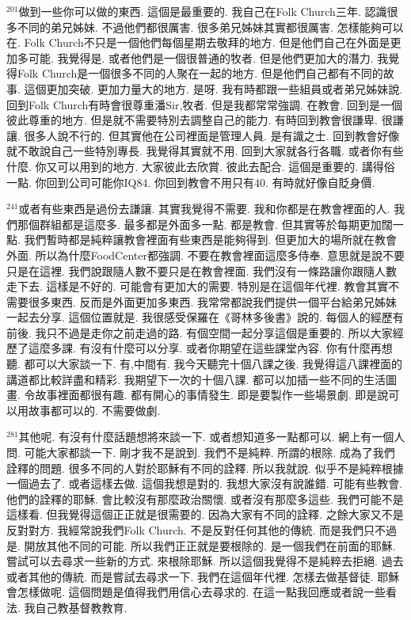 \documentclass{book}
\begin{document}
$^{201}$做到一些你可以做的東西.
這個是最重要的.
我自己在Folk Church三年.
認識很多不同的弟兄姊妹.
不過他們都很厲害.
很多弟兄姊妹其實都很厲害.
怎樣能夠可以在.
Folk Church不只是一個他們每個星期去敬拜的地方.
但是他們自己在外面是更加多可能.
我覺得是.
或者他們是一個很普通的牧者.
但是他們更加大的潛力.
我覺得Folk Church是一個很多不同的人聚在一起的地方.
但是他們自己都有不同的故事.
這個更加突破.
更加力量大的地方.
是呀.
我有時都跟一些組員或者弟兄姊妹說.
回到Folk Church有時會很尊重潘Sir,牧者.
但是我都常常強調.
在教會.
回到是一個彼此尊重的地方.
但是就不需要特別去調整自己的能力.
有時回到教會很謙卑.
很謙讓.
很多人說不行的.
但其實他在公司裡面是管理人員.
是有識之士.
回到教會好像就不敢說自己一些特別專長.
我覺得其實就不用.
回到大家就各行各職.
或者你有些什麼.
你又可以用到的地方.
大家彼此去欣賞.
彼此去配合.
這個是重要的.
講得俗一點.
你回到公司可能你IQ84.
你回到教會不用只有40.
有時就好像自貶身價.

$^{241}$或者有些東西是過份去謙讓.
其實我覺得不需要.
我和你都是在教會裡面的人.
我們那個群組都是這麼多.
最多都是外面多一點.
都是教會.
但其實等於每期更加闊一點.
我們暫時都是純粹讓教會裡面有些東西是能夠得到.
但更加大的場所就在教會外面.
所以為什麼FoodCenter都強調.
不要在教會裡面這麼多侍奉.
意思就是說不要只是在這裡.
我們說跟隨人數不要只是在教會裡面.
我們沒有一條路讓你跟隨人數走下去.
這樣是不好的.
可能會有更加大的需要.
特別是在這個年代裡.
教會其實不需要很多東西.
反而是外面更加多東西.
我常常都說我們提供一個平台給弟兄姊妹一起去分享.
這個位置就是.
我很感受保羅在《哥林多後書》說的.
每個人的經歷有前後.
我只不過是走你之前走過的路.
有個空間一起分享這個是重要的.
所以大家經歷了這麼多課.
有沒有什麼可以分享.
或者你期望在這些課堂內容.
你有什麼再想聽.
都可以大家談一下.
有,中間有.
我今天聽完十個八課之後.
我覺得這八課裡面的講道都比較詳盡和精彩.
我期望下一次的十個八課.
都可以加插一些不同的生活圖畫.
令故事裡面都很有趣.
都有開心的事情發生.
即是要製作一些場景劇.
即是說可以用故事都可以的.
不需要做劇.

$^{281}$其他呢.
有沒有什麼話題想將來談一下.
或者想知道多一點都可以.
網上有一個人問.
可能大家都談一下.
剛才我不是說到.
我們不是純粹.
所謂的根除.
成為了我們詮釋的問題.
很多不同的人對於耶穌有不同的詮釋.
所以我就說.
似乎不是純粹根據一個過去了.
或者這樣去做.
這個我想是對的.
我想大家沒有說誰錯.
可能有些教會.
他們的詮釋的耶穌.
會比較沒有那麼政治關懷.
或者沒有那麼多這些.
我們可能不是這樣看.
但我覺得這個正正就是很需要的.
因為大家有不同的詮釋.
之餘大家又不是反對對方.
我經常說我們Folk Church.
不是反對任何其他的傳統.
而是我們只不過是.
開放其他不同的可能.
所以我們正正就是要根除的.
是一個我們在前面的耶穌.
嘗試可以去尋求一些新的方式.
來根除耶穌.
所以這個我覺得不是純粹去拒絕.
過去或者其他的傳統.
而是嘗試去尋求一下.
我們在這個年代裡.
怎樣去做基督徒.
耶穌會怎樣做呢.
這個問題是值得我們用信心去尋求的.
在這一點我回應或者說一些看法.
我自己教基督教教育.
\end{document}
